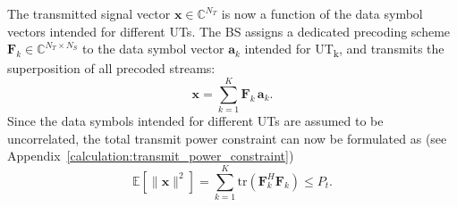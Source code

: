 The transmitted signal vector $\mathbf{x} \in \mathbb{C}^{N_T}$ is now a function of the data symbol vectors intended for different \acp{UT}. The \ac{BS} assigns a dedicated precoding scheme $\mathbf{F}_k \in \mathbb{C}^{N_T \times N_S}$ to the data symbol vector $\mathbf{a}_k$ intended for \ac{UT}\textsubscript{k}, and transmits the superposition of all precoded streams:
\begin{equation}
\label{eq:mu_mimo_precoding}
    \mathbf{x} = \sum_{k=1}^{K} \mathbf{F}_k \, \mathbf{a}_k.
\end{equation}
Since the data symbols intended for different \acp{UT} are assumed to be uncorrelated, the total transmit power constraint can now be formulated as (see Appendix~\ref{calculation:transmit_power_constraint})
\begin{equation}
\label{eq:mu_mimo_power_constraint}
    \mathbb{E}\!\left[\|\mathbf{x}\|^2\right] = \sum_{k=1}^{K} \mathrm{tr}\!\left(\mathbf{F}_k^H \mathbf{F}_k\right) \leq P_t.
\end{equation}

